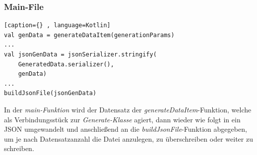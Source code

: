 \subsubsection{Main-File}
\begin{lstlisting}[caption={} , language=Kotlin]
val genData = generateDataItem(generationParams)
...
val jsonGenData = jsonSerializer.stringify(
    GeneratedData.serializer(), 
    genData)
...
buildJsonFile(jsonGenData)
\end{lstlisting}
\vspace{4mm}\par
In der \textit{main-Funktion} wird der Datensatz der \textit{generateDataItem}-Funktion, welche als Verbindungsstück zur \textit{Generate-Klasse} agiert, dann wieder wie folgt in ein JSON umgewandelt und anschließend an die \textit{buildJsonFile}-Funktion abgegeben, um je nach Datensatzanzahl die Datei anzulegen, zu überschreiben oder weiter zu schreiben. 

